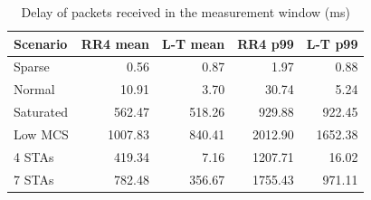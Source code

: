 \begin{table}[t]
\caption{Delay of packets received in the measurement window (ms)}
\label{tab:delay}
\centering\footnotesize
\setlength{\tabcolsep}{3pt}
\begin{tabular}{lrrrr}
\toprule
Scenario & RR4 mean & L-T mean & RR4 p99 & L-T p99 \\
\midrule
Sparse & 0.56 & 0.87 & 1.97 & 0.88 \\
Normal & 10.91 & 3.70 & 30.74 & 5.24 \\
Saturated & 562.47 & 518.26 & 929.88 & 922.45 \\
Low MCS & 1007.83 & 840.41 & 2012.90 & 1652.38 \\
4 STAs & 419.34 & 7.16 & 1207.71 & 16.02 \\
7 STAs & 782.48 & 356.67 & 1755.43 & 971.11 \\
\bottomrule
\end{tabular}
\end{table}
